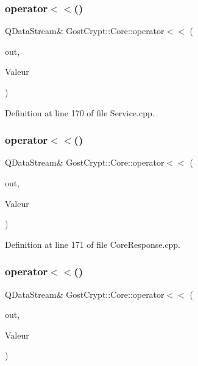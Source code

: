\subsubsection{\texorpdfstring{operator$<$$<$()}{operator<<()}\hspace{0.1cm}{\footnotesize\ttfamily [28/56]}}
{\footnotesize\ttfamily Q\+Data\+Stream\& Gost\+Crypt\+::\+Core\+::operator$<$$<$ (\begin{DoxyParamCaption}\item[{Q\+Data\+Stream \&}]{out,  }\item[{const \hyperlink{struct_gost_crypt_1_1_core_1_1_init_response}{Init\+Response} \&}]{Valeur }\end{DoxyParamCaption})}



Definition at line 170 of file Service.\+cpp.

\mbox{\label{namespace_gost_crypt_1_1_core_a70a95d0a08d31a4f97018fc16eefe3f4}} 
\subsubsection{\texorpdfstring{operator$<$$<$()}{operator<<()}\hspace{0.1cm}{\footnotesize\ttfamily [29/56]}}
{\footnotesize\ttfamily Q\+Data\+Stream\& Gost\+Crypt\+::\+Core\+::operator$<$$<$ (\begin{DoxyParamCaption}\item[{Q\+Data\+Stream \&}]{out,  }\item[{const \hyperlink{struct_gost_crypt_1_1_core_1_1_get_derivation_functions_response}{Get\+Derivation\+Functions\+Response} \&}]{Valeur }\end{DoxyParamCaption})}



Definition at line 171 of file Core\+Response.\+cpp.

\mbox{\label{namespace_gost_crypt_1_1_core_a8b3b0845322530474cb031d3a8cf1df2}} 
\subsubsection{\texorpdfstring{operator$<$$<$()}{operator<<()}\hspace{0.1cm}{\footnotesize\ttfamily [30/56]}}
{\footnotesize\ttfamily Q\+Data\+Stream\& Gost\+Crypt\+::\+Core\+::operator$<$$<$ (\begin{DoxyParamCaption}\item[{Q\+Data\+Stream \&}]{out,  }\item[{const \hyperlink{class_gost_crypt_1_1_core_1_1_failed_detach_loop_device}{Gost\+Crypt\+::\+Core\+::\+Failed\+Detach\+Loop\+Device} \&}]{Valeur }\end{DoxyParamCaption})}



